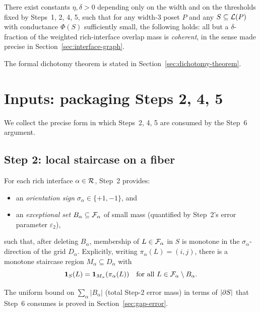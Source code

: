 \begin{proposition}\label{prop:step6-informal}
There exist constants $\eta,\delta>0$ depending only on the width and on
the thresholds fixed by Steps~1, 2, 4, 5, such that for any width-3
poset $P$ and any $S\subseteq\mathcal{L}(P)$ with conductance $\Phi(S)$
sufficiently small, the following holds: all but a $\delta$-fraction of
the weighted rich-interface overlap mass is \emph{coherent}, in the
sense made precise in Section~\ref{sec:interface-graph}.
\end{proposition}

The formal dichotomy theorem is stated in
Section~\ref{sec:dichotomy-theorem}.

\section{Inputs: packaging Steps 2, 4, 5}

We collect the precise form in which Steps~2, 4, 5 are consumed by the
Step~6 argument.

\subsection{Step 2: local staircase on a fiber}

For each rich interface $\alpha\in\mathcal{R}$, Step~2 provides:
\begin{itemize}[nosep]
  \item an \emph{orientation sign} $\sigma_\alpha\in\{+1,-1\}$, and
  \item an \emph{exceptional set} $B_\alpha\subseteq\mathcal{F}_{\alpha}$
  of small mass (quantified by Step~2's error parameter $\varepsilon_2$),
\end{itemize}
such that, after deleting $B_\alpha$, membership of $L\in\mathcal{F}_{\alpha}$
in $S$ is monotone in the $\sigma_\alpha$-direction of the grid
$D_\alpha$.
Explicitly, writing $\pi_\alpha(L)=(i,j)$, there is a monotone staircase
region $M_\alpha\subseteq D_\alpha$ with
\[
\mathbf{1}_S(L)
 =\mathbf{1}_{M_\alpha}(\pi_\alpha(L))\quad
\text{for all } L\in\mathcal{F}_{\alpha}\setminus B_\alpha.
\]

The uniform bound on $\sum_\alpha |B_\alpha|$ (total Step-2 error mass)
in terms of $|\partial S|$ that Step~6 consumes is proved in
Section~\ref{sec:gap-error}.

